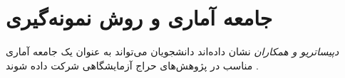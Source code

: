 



\section{جامعه آماری و روش نمونه‌گیری}
\textit{دپیساتریو و همکاران}
نشان داده‌اند دانشجویان می‌تواند به عنوان یک جامعه آماری مناسب در پژوهش‌های حراج آزمایشگاهی شرکت داده شوند
\!\citep{depositarioShouldStudentsBe2009}
\!.
